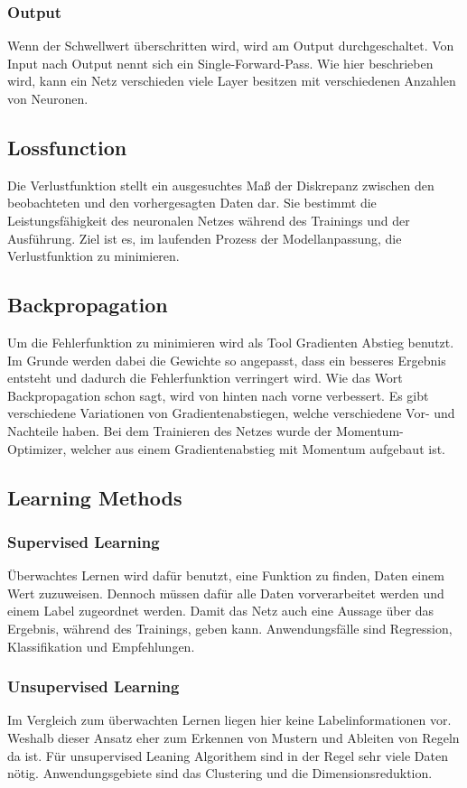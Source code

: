 \subsubsection{Output}
Wenn der Schwellwert überschritten wird, wird am Output durchgeschaltet.
Von Input nach Output nennt sich ein Single-Forward-Pass. Wie hier beschrieben wird, kann ein Netz verschieden viele Layer besitzen mit verschiedenen Anzahlen von Neuronen.

\subsection{Lossfunction}
Die Verlustfunktion stellt ein ausgesuchtes Maß der Diskrepanz zwischen den beobachteten und den vorhergesagten Daten dar. Sie bestimmt die Leistungsfähigkeit des neuronalen Netzes während des Trainings und der Ausführung. Ziel ist es, im laufenden Prozess der Modellanpassung, die Verlustfunktion zu minimieren.

\subsection{Backpropagation}
Um die Fehlerfunktion zu minimieren wird als Tool Gradienten Abstieg benutzt. Im Grunde werden dabei die Gewichte so angepasst, dass ein besseres Ergebnis entsteht und dadurch die Fehlerfunktion verringert wird. Wie das Wort Backpropagation schon sagt, wird von hinten nach vorne verbessert. Es gibt verschiedene Variationen von Gradientenabstiegen, welche verschiedene Vor- und Nachteile haben. Bei dem Trainieren des Netzes wurde der Momentum-Optimizer, welcher aus einem Gradientenabstieg mit Momentum aufgebaut ist.

\subsection{Learning Methods}

\subsubsection{Supervised Learning}
Überwachtes Lernen wird dafür benutzt, eine Funktion zu finden, Daten einem Wert zuzuweisen. Dennoch müssen dafür alle Daten vorverarbeitet werden und einem Label zugeordnet werden. Damit das Netz auch eine Aussage über das Ergebnis, während des Trainings, geben kann. Anwendungsfälle sind Regression, Klassifikation und Empfehlungen.

\subsubsection{Unsupervised Learning}
Im Vergleich zum überwachten Lernen liegen hier keine Labelinformationen vor. Weshalb dieser Ansatz eher zum Erkennen von Mustern und Ableiten von Regeln da ist. Für unsupervised Leaning Algorithem sind in der Regel sehr viele Daten nötig. Anwendungsgebiete sind das Clustering und die Dimensionsreduktion.

